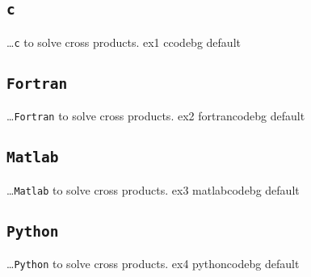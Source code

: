 \subsection{\texttt{c}}
    {}
    {\ldots \texttt{c} to solve cross products.}
    {ex1}
    {\footnotesize}
    {ccodebg}
    {default}

\subsection{\texttt{Fortran}}
    {}
    {\ldots \texttt{Fortran} to solve cross products.}
    {ex2}
    {\footnotesize}
    {fortrancodebg}
    {default}

\subsection{\texttt{Matlab}}
    {}
    {\ldots \texttt{Matlab} to solve cross products.}
    {ex3}
    {\footnotesize}
    {matlabcodebg}
    {default}

\subsection{\texttt{Python}}
    {}
    {\ldots \texttt{Python} to solve cross products.}
    {ex4}
    {\footnotesize}
    {pythoncodebg}
    {default}